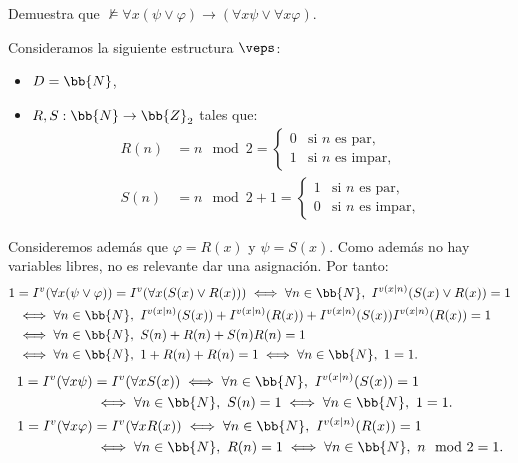 \begin{ejercicio}\label{ej:2.7}
    Demuestra que $\not\models \forall x(\psi \vee \varphi) \rightarrow (\forall x \psi \vee \forall x \varphi)$.

    Consideramos la siguiente estructura $\veps$:
    \begin{itemize}
        \item $D = \bb{N}$,
        \item $R,S:\bb{N}\rightarrow\bb{Z}_2$ tales que:
        \begin{align*}
            R(n) &= n\mod 2=\begin{cases}
                0 & \text{si }n\text{ es par},\\
                1 & \text{si }n\text{ es impar},
            \end{cases}\\
            S(n) &= n\mod 2+1=\begin{cases}
                1 & \text{si }n\text{ es par},\\
                0 & \text{si }n\text{ es impar},
            \end{cases}
        \end{align*}
    \end{itemize}

    Consideremos además que $\varphi=R(x)$ y $\psi=S(x)$. Como además no hay variables libres, no es relevante dar una asignación. Por tanto:
    \begin{align*}
        1 &= I^v(\forall x(\psi \vee \varphi))= I^v(\forall x(S(x) \vee R(x))) \iff \forall n\in\bb{N},\ I^{v(x\mid n)}(S(x) \vee R(x)) = 1\\
        &\iff \forall n\in\bb{N},\ I^{v(x\mid n)}(S(x)) + I^{v(x\mid n)}(R(x)) + I^{v(x\mid n)}(S(x))I^{v(x\mid n)}(R(x)) = 1\\
        &\iff \forall n\in\bb{N},\ S(n) + R(n) + S(n)R(n) = 1\\
        &\iff \forall n\in\bb{N},\ 1 + R(n) + R(n) = 1\iff \forall n\in\bb{N},\ 1 = 1.
    \end{align*}
    \begin{align*}
        1 = I^v(\forall x \psi)&=I^v(\forall x S(x)) \iff \forall n\in\bb{N},\ I^{v(x\mid n)}(S(x)) = 1\\
        &\iff \forall n\in\bb{N},\ S(n) = 1\iff \forall n\in\bb{N},\ 1 = 1.\\
        1 = I^v(\forall x \varphi)&=I^v(\forall x R(x)) \iff \forall n\in\bb{N},\ I^{v(x\mid n)}(R(x)) = 1\\
        &\iff \forall n\in\bb{N},\ R(n) = 1\iff \forall n\in\bb{N},\ n\mod 2 = 1.
    \end{align*}


\end{ejercicio}
